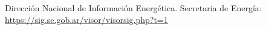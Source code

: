 \newpage

\begin{thebibliography}{99}
Dirección Nacional de Información Energética. Secretaria de Energía: \url{https://sig.se.gob.ar/visor/visorsig.php?t=1}

\end{thebibliography}


\newpage